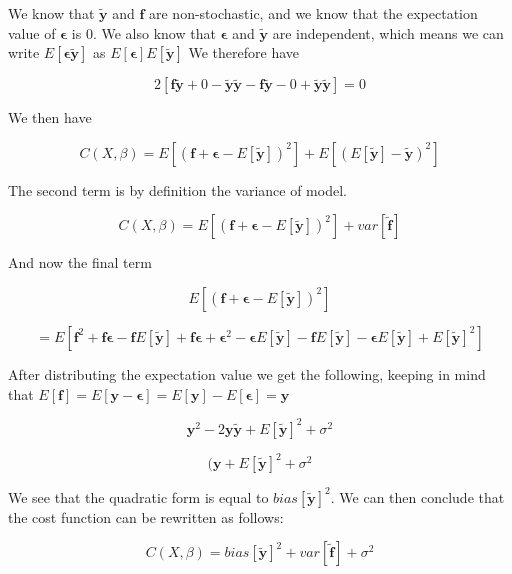 \documentclass{article}
\begin{document}
We know that $\bm{\tilde{y}}$ and $\bm{f}$ are non-stochastic, and we know that the expectation value of $\bm{\epsilon}$ is $0$. We also know that 
$\bm{\epsilon}$ and $\bm{\tilde{y}}$ are independent, which means we can write $E[\bm{\epsilon}\bm{\tilde{y}}]$ as $E[\bm{\epsilon}]E[\bm{\tilde{y}}]$ We therefore have

\[ 2\left[\bm{f}\bm{\tilde{y}} + 0 - \bm{\tilde{y}}\bm{\tilde{y}} - \bm{f}\bm{\tilde{y}} - 0 + \bm{\tilde{y}}\bm{\tilde{y}}\right] = 0 \]

We then have

\[ C(X,\beta) = E\left[(\bm{f} + \bm{\epsilon} - E[\bm{\tilde{y}}])^2\right] + E\left[(E[\bm{\tilde{y}}] - \bm{\tilde{y}})^2\right] \]

The second term is by definition the variance of model.

\[ C(X,\beta) = E\left[(\bm{f} + \bm{\epsilon} - E[\bm{\tilde{y}}])^2\right] + var[\bm{\tilde{f}}] \]

And now the final term

\[ E\left[(\bm{f} + \bm{\epsilon} - E[\bm{\tilde{y}}])^2\right] \]

\[ = E\left[\bm{f}^2 + \bm{f}\bm{\epsilon} - \bm{f}E[\bm{\tilde{y}}] + \bm{f\epsilon} + \bm{\epsilon}^2 - \bm{\epsilon}E[\bm{\tilde{y}}] - \bm{f}E[\bm{\tilde{y}}] - \bm{\epsilon}E[\bm{\tilde{y}}] + E[\bm{\tilde{y}}]^2 \right] \]

After distributing the expectation value we get the following, keeping in mind that $E[\bm{f}] = E[\bm{y} - \bm{\epsilon}] = E[\bm{y}] - E[\bm{\epsilon}] = \bm{y}$

\[ \bm{y}^2 - 2\bm{y}\bm{\tilde{y}} + E[\bm{\tilde{y}}]^2 + \sigma^2\]

\[ (\bm{y} + E[\bm{\tilde{y}}]^2 + \sigma^2 \]

We see that the quadratic form is equal to $bias[\bm{\tilde{y}}]^2$. We can then conclude that the cost function can be rewritten as follows:

\[ C(X,\beta) = bias[\bm{\tilde{y}}]^2 + var[\bm{\tilde{f}}] + \sigma^2 \]



\end{document}
